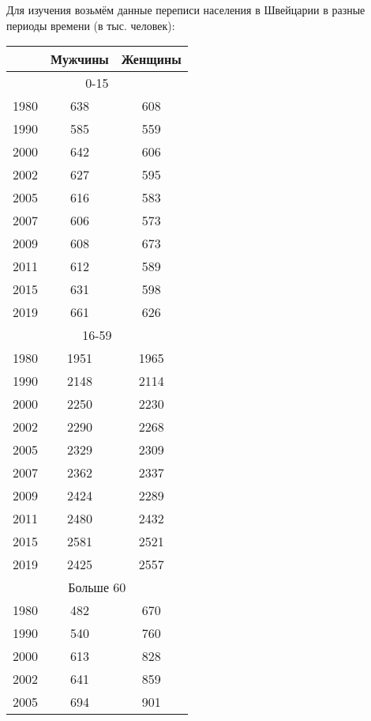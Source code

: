 \documentclass[utf8, a4paper, 14pt, russian, oneside]{book}
\begin{document}


\tableofcontents
\newpage


Для изучения возьмём данные переписи населения в Швейцарии в разные периоды времени (в тыс. человек):
\begin{table}[h!]
    \centering
    \small
    \begin{tabular}{|c|c|c|}
        \hline
        & \textbf{Мужчины} & \textbf{Женщины} \\ \hline
        \multicolumn{3}{|c|}{0-15} \\ \hline
        1980 & 638 & 608 \\ \hline
        1990 & 585 & 559 \\ \hline
        2000 & 642 & 606 \\ \hline
        2002 & 627 & 595 \\ \hline
        2005 & 616 & 583 \\ \hline

        2007 & 606 & 573 \\ \hline
        2009 & 608 & 673 \\ \hline
        2011 & 612 & 589 \\ \hline
        2015 & 631 & 598 \\ \hline
        2019 & 661 & 626 \\ \hline

        \multicolumn{3}{|c|}{16-59} \\ \hline
        1980 & 1951 & 1965 \\ \hline
        1990 & 2148 & 2114 \\ \hline
        2000 & 2250 & 2230\\ \hline
        2002 & 2290 & 2268 \\ \hline
        2005 & 2329 & 2309 \\ \hline

        2007 & 2362 & 2337 \\ \hline
        2009 & 2424 & 2289 \\ \hline
        2011 & 2480 & 2432 \\ \hline
        2015 & 2581 & 2521 \\ \hline
        2019 & 2425 & 2557 \\ \hline

        \multicolumn{3}{|c|}{Больше 60} \\ \hline
        1980 & 482 & 670 \\ \hline
        1990 & 540 & 760 \\ \hline
        2000 & 613 & 828 \\ \hline
        2002 & 641 & 859 \\ \hline
        2005 & 694 & 901 \\ \hline


\end{tabular}
\end{table}
\end{document}
